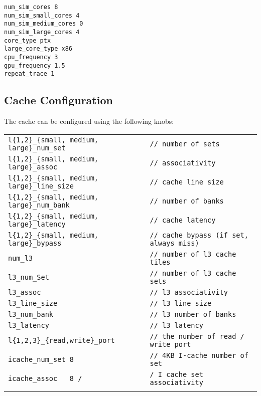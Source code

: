 \begin{Verbatim}
num_sim_cores 8
num_sim_small_cores 4
num_sim_medium_cores 0
num_sim_large_cores 4
core_type ptx
large_core_type x86
cpu_frequency 3
gpu_frequency 1.5
repeat_trace 1
\end{Verbatim}



\subsection{Cache Configuration}
\label{sec:knob:cache}

The cache can be configured using the following knobs:

\begin{tabular}{l l}
 \\
 \Verb+l{1,2}_{small, medium, large}_num_set+ & \Verb+// number of sets+ \\
 \Verb+l{1,2}_{small, medium, large}_assoc+ & \Verb+// associativity+ \\
 \Verb+l{1,2}_{small, medium, large}_line_size+ & \Verb+// cache line size+ \\
 \Verb+l{1,2}_{small, medium, large}_num_bank+ & \Verb+// number of banks+ \\
 \Verb+l{1,2}_{small, medium, large}_latency + & \Verb+// cache latency+ \\
 \Verb+l{1,2}_{small, medium, large}_bypass + & \Verb+// cache bypass (if set, always miss)+ \\
 \Verb+num_l3 + & \Verb+// number of l3 cache tiles+ \\
 \Verb+l3_num_Set + & \Verb+// number of l3 cache sets+ \\
 \Verb+l3_assoc + & \Verb+// l3 associativity+ \\
 \Verb+l3_line_size+ & \Verb+// l3 line size+ \\
 \Verb+l3_num_bank+ & \Verb+// l3 number of banks+ \\
 \Verb+l3_latency + & \Verb+// l3 latency+ \\
 \Verb+l{1,2,3}_{read,write}_port + & \Verb+// the number of read / write port+ \\
 \Verb+icache_num_set 8 + & \Verb+// 4KB I-cache number of set+ \\
 \Verb+icache_assoc   8 /+ & \Verb+/ I cache set associativity + \\
 \\
\end{tabular}


